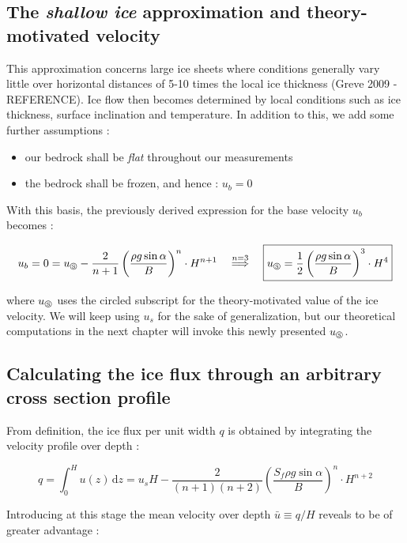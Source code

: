 \subsection*{The \textit{shallow ice} approximation and theory-motivated velocity}

This approximation concerns large ice sheets where conditions generally vary little over horizontal distances of 5-10 times the local ice thickness (Greve 2009 - REFERENCE). Ice flow then becomes determined by local conditions such as ice thickness, surface inclination and temperature.
In addition to this, we add some further assumptions :

\begin{itemize}
    \item our bedrock shall be \textit{flat} throughout our measurements
    \item the bedrock shall be frozen, and hence : $u_b = 0$
\end{itemize}

With this basis, the previously derived expression for the base velocity $u_b$ becomes :

\begin{equation}u_b = 0 = u_\circledS - \frac{2}{n + 1} \left( \frac{\rho g \sin{\alpha}}{B}\right)^n \cdot H^{n+1}
\quad
\stackrel{n = 3}{\Longrightarrow}
\quad
\boxed{u_\circledS = \frac{1}{2} \left( \frac{\rho g \sin{\alpha}}{B}\right)^3 \cdot H^4}\end{equation}

where $u_\circledS$ uses the circled subscript for the theory-motivated value of the ice velocity. We will keep using $u_s$ for the sake of generalization, but our theoretical computations in the next chapter will invoke this newly presented $u_\circledS$. 


\subsection*{Calculating the ice flux through an arbitrary cross section profile}

From definition, the ice flux per unit width $q$ is obtained by integrating the velocity profile over depth :

\begin{equation}q = \int_0^H u(z) \, \mathrm{d} z = u_s H - \frac{2}{(n+1)(n+2)} \left( \frac{S_f \rho g \sin{\alpha}}{B}\right)^n \cdot H^{n+2}\end{equation}

Introducing at this stage the mean velocity over depth $\bar{u} \equiv q/H$ reveals to be of greater advantage :

